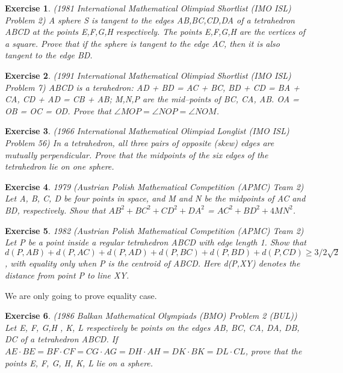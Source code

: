 \documentclass{article}
\newtheorem{z}{Exercise}
\begin{document}
    \begin{z} \textup{(1981 International Mathematical Olimpiad Shortlist (IMO ISL) Problem 2)}
        A sphere S is tangent to the edges AB,BC,CD,DA of a tetrahedron ABCD at the points E,F,G,H respectively. The points E,F,G,H are the vertices of a square. Prove that if the sphere is tangent to the edge AC, then it is also tangent to the edge BD. 
    \end{z}

    \begin{z} \textup{(1991 International Mathematical Olimpiad Shortlist (IMO ISL) Problem 7)}
        ABCD is a terahedron: AD + BD = AC + BC, BD + CD = BA + CA, CD + AD = CB + AB;  M,N,P are the mid--points of BC, CA, AB. 
        OA = OB = OC = OD. Prove that  $\angle MOP = \angle NOP = \angle NOM$. 
    \end{z}

    \begin{z} \textup{(1966 International Mathematical Olimpiad Longlist (IMO ISL) Problem 56)}
        In a tetrahedron, all three pairs of opposite (skew) edges are mutually perpendicular. Prove that the midpoints of the six edges of the tetrahedron lie on one sphere. 
    \end{z}

    \begin{z} \textup{1979 (Austrian Polish Mathematical Competition (APMC) Team 2)}
        Let A, B, C, D be four points in space, and M and N be the midpoints of AC and BD, respectively. 
        Show that $AB^2+BC^2+CD^2+DA^2$ = $AC^2+BD^2+4MN^2$.
    \end{z}

    \begin{z} \textup{1982 (Austrian Polish Mathematical Competition (APMC) Team 2)}
        Let P be a point inside a regular tetrahedron ABCD with edge length 1. Show that 
        $d(P,AB)+d(P,AC)+d(P,AD)+d(P,BC)+d(P,BD)+d(P,CD) \ge 3/2 \sqrt{2}$ , 
        with equality only when P is the centroid of ABCD. Here d(P,XY) denotes the distance from point P to line XY.
    \end{z}

    We are only going to prove equality case.

    \begin{z} \textup{(1986 Balkan Mathematical Olympiads (BMO) Problem 2 (BUL))}
        Let E, F, G,H , K, L respectively be points on the edges AB, BC, CA, DA, DB, DC  of a tetrahedron ABCD. 
        If $AE \cdot BE = BF \cdot CF = CG\cdot AG = DH\cdot AH = DK\cdot BK = DL\cdot CL$,  prove that the points E, F, G, H, K, L lie on a sphere. 
    \end{z}
\end{document}
